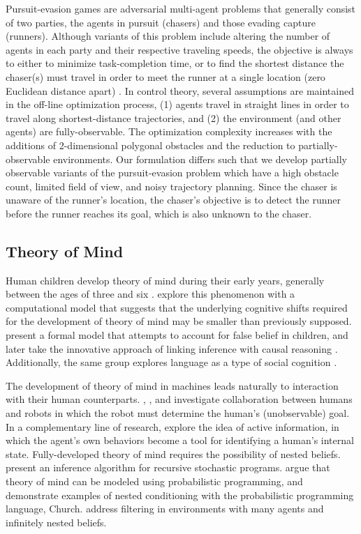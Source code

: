\documentclass{article}
\begin{document}
Pursuit-evasion games are adversarial multi-agent problems that generally consist of two parties, the agents in pursuit (chasers) and those evading capture (runners). Although variants of this problem include altering the number of agents in each party and their respective traveling speeds, the objective is always to either to minimize task-completion time, or to find the shortest distance the chaser(s) must travel in order to meet the runner at a single location (zero Euclidean distance apart) \cite{yan2018multiagent, makkapati2018optimal}. In control theory, several assumptions are maintained in the off-line optimization process, (1) agents travel in straight lines in order to travel along shortest-distance trajectories, and (2) the environment (and other agents) are fully-observable. The optimization complexity increases with the additions of 2-dimensional polygonal obstacles and the reduction to partially-observable environments. Our formulation differs such that we develop partially observable variants of the pursuit-evasion problem which have a high obstacle count, limited field of view, and noisy trajectory planning. Since the chaser is unaware of the runner's location, the chaser's objective is to detect the runner before the runner reaches its goal, which is also unknown to the chaser. 

\subsection{Theory of Mind}

Human children develop theory of mind during their
early years, generally between the ages of three and
six
\cite{wellman1990child,chater2006probabilistic}. \citet{bello2006developmental}
explore this phenomenon with a computational model that suggests that the underlying cognitive shifts required for the development of theory of mind may be smaller than previously supposed. 
%
\citet{goodman2006intuitive} present a formal model that
attempts to account for false belief in
children, and later take the innovative approach of
linking inference with causal reasoning \cite{goodman2009cause}. Additionally, the same group explores language as a type of social
cognition \cite{goodman2013knowledge}.
%

The development of theory of mind in machines leads naturally to interaction with their human counterparts. \citet{awais2010human}, \citet{fern2007decision}, and \citet{nguyen2012capir} investigate collaboration between humans and robots in which the robot must determine the human's (unobservable) goal. In a complementary line of research, \citet{sadigh2016information} explore the idea of active information, in which the agent's own behaviors become a tool for identifying a human's internal state. Fully-developed theory of mind requires the possibility of nested beliefs. \citet{koller1997effective} present an inference algorithm for recursive stochastic programs. \citet{frith2005theory} argue that theory of mind can be modeled using probabilistic programming, and demonstrate examples of nested conditioning with the probabilistic programming language, Church. \citet{zettlemoyer2009multi} address filtering in environments with many agents and infinitely nested beliefs. 
\end{document}
